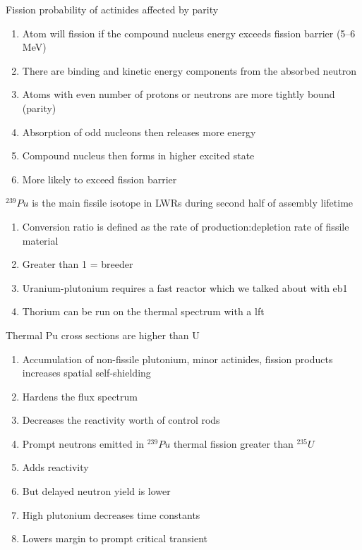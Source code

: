 \documentclass[aspectratio=1610,pdftex,dvipsnames,compress,xcolor={dvipsnames}]{beamer}
\newcommand{\acf}{\acrfull} %
\newcommand{\acs}{\acrshort} %
\begin{document}
\begin{frame}{Fission probability of actinides affected by parity}
    \begin{enumerate}[series=outerlist,topsep=0pt,itemsep=18pt,leftmargin=*,label=(\arabic*)]
        \item[]Atom will fission if the compound nucleus energy exceeds fission barrier (5--6 MeV)
        \item[]There are binding and kinetic energy components from the absorbed neutron
        \item[]Atoms with even number of protons or neutrons are more tightly bound (parity)
        \item[]Absorption of odd nucleons then releases more energy
        \item[]Compound nucleus then forms in higher excited state
        \item[]More likely to exceed fission barrier
    \end{enumerate}
\end{frame}


\begin{frame}{$^{239}Pu$ is the main fissile isotope in LWRs during second half of assembly lifetime}
    \begin{enumerate}[series=outerlist,topsep=0pt,itemsep=18pt,leftmargin=*,label=(\arabic*)]
        \item[]Conversion ratio is defined as the rate of production:depletion rate of fissile material
        \item[]Greater than 1 = breeder
        \item[]Uranium-plutonium requires a fast reactor which we talked about with \acs{eb1}
        \item[]Thorium can be run on the thermal spectrum with a \acf{lft}
    \end{enumerate}
\end{frame}


\begin{frame}{Thermal Pu cross sections are higher than U}
    \begin{enumerate}[series=outerlist,topsep=0pt,itemsep=15pt,leftmargin=*,label=(\arabic*)]
        \item[]Accumulation of non-fissile plutonium, minor actinides, fission products increases spatial self-shielding
        \item[]Hardens the flux spectrum
        \item[]Decreases the reactivity worth of control rods
        \item[]Prompt neutrons emitted in $^{239}Pu$ thermal fission greater than $^{235}U$
        \item[]Adds reactivity
        \item[]But delayed neutron yield is lower
        \item[]High plutonium decreases time constants
        \item[]Lowers margin to prompt critical transient
    \end{enumerate}
\end{frame}
\end{document}
